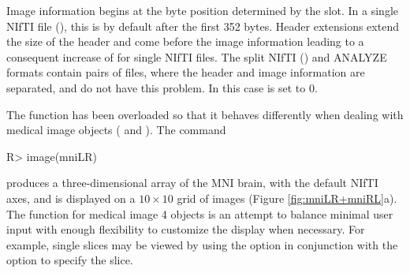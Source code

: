 \documentclass[
]{article}
\begin{document}
Image information begins at the byte position determined by the
 slot. In a single NIfTI file (), this is by default after the first 352
bytes. Header extensions extend the size of the header and come before
the image information leading to a consequent increase of
 for single NIfTI files. The split NIfTI () and ANALYZE formats contain pairs of files,
where the header and image information are separated, and do not have
this problem. In this case  is set to 0.

The  function has been overloaded so that it behaves
differently when dealing with medical image objects ( and
). The command

\begin{CodeChunk}

\begin{CodeInput}
R> image(mniLR)
\end{CodeInput}
\end{CodeChunk}

produces a three-dimensional array of the MNI brain, with the default
NIfTI axes, and is displayed on a \(10{\times}10\) grid of images
(Figure \ref{fig:mniLR+mniRL}a). The  function for medical
image 4 objects is an attempt to balance minimal user input
with enough flexibility to customize the display when necessary. For
example, single slices may be viewed by using the option
 in conjunction with the option  to
specify the slice.
\end{document}
